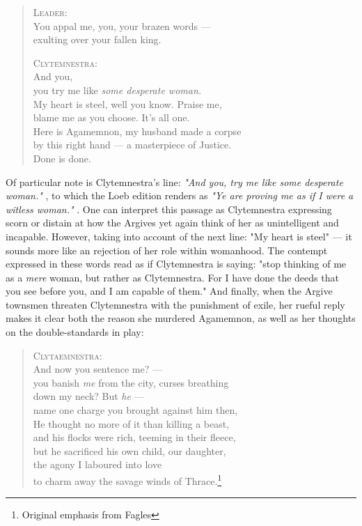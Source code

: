 \begin{quote}
  \textsc{Leader}:\\
  You appal me, you, your brazen words --- \\
  exulting over your fallen king.

  \textsc{Clytemnestra}: \\
  And you, \\
  you try me like \emph{some desperate woman.} \\
  My heart is steel, well you know. Praise me, \\
  blame me as you choose. It's all one. \\
  Here is Agamemnon, my husband made a corpse \\
  by this right hand --- a masterpiece of Justice. \\
  Done is done.

  \autocite[1425]{fagles}
\end{quote}

\noindent
Of particular note is Clytemnestra's line: \emph{"And you, try me like some
desperate woman."} \autocite[1426]{fagles}, to which the Loeb edition renders as
\emph{"Ye are proving me as if I were a witless woman."} \autocite[1426]{loeb}.
One can interpret this passage as Clytemnestra expressing scorn or distain at
how the Argives yet again think of her as unintelligent and incapable. However,
taking into account of the next line: "My heart is steel" --- it sounds more
like an rejection of her role within womanhood. The contempt expressed in these
words read as if Clytemnestra is saying: "stop thinking of me as a \emph{mere}
woman, but rather as Clytemnestra. For I have done the deeds that you see
before you, and I am capable of them." And finally, when the Argive townsmen
threaten Clytemnestra with the punishment of exile, her rueful reply makes it
clear both the reason she murdered Agamemnon, as well as her thoughts on the
double-standards in play:

\begin{quote}
  \textsc{Clytaemnestra}:\\
  And now you sentence me? ---\\
  you banish \emph{me} from the city, curses breathing \\
  down my neck? But \emph{he} ---\\
  name one charge you brought against him then,\\
  He thought no more of it than killing a beast,\\
  and his flocks were rich, teeming in their fleece,\\
  but he sacrificed his own child, our daughter,\\
  the agony I laboured into love\\
  to charm away the savage winds of Thrace.\footnote{Original emphasis from
  Fagles}

  \autocite[1437]{fagles}
\end{quote}

